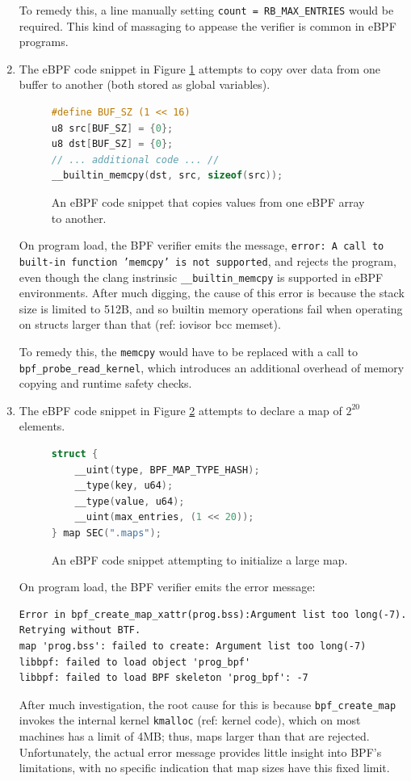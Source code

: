 \begin{enumerate}
    To remedy this, a line manually setting \texttt{count = RB\_MAX\_ENTRIES} would be required.
    This kind of massaging to appease the verifier is common in eBPF programs.

    \item The eBPF code snippet in Figure \ref{code:fail-2} attempts to copy over data from one
        buffer to another (both stored as global variables).
\begin{figure}[htpb]
\begin{lstlisting}[language=C]
#define BUF_SZ (1 << 16)
u8 src[BUF_SZ] = {0};
u8 dst[BUF_SZ] = {0};
// ... additional code ... //
__builtin_memcpy(dst, src, sizeof(src));
\end{lstlisting}
    \caption{An eBPF code snippet that copies values from one eBPF array to another.}
    \label{code:fail-2}
\end{figure}
    On program load, the BPF verifier emits the message, \texttt{error: A call to built-in
    function 'memcpy' is not supported}, and rejects the program, even though the clang instrinsic
    \texttt{\_\_builtin\_memcpy} is supported in eBPF environments. After much digging, the cause of
    this error is because the stack size is limited to 512B, and so builtin memory operations fail
    when operating on structs larger than that (ref: iovisor bcc memset).

    To remedy this, the \texttt{memcpy} would have to be replaced with a call to
    \texttt{bpf\_probe\_read\_kernel}, which introduces an additional overhead of memory copying and
    runtime safety checks.

    \item The eBPF code snippet in Figure \ref{code:fail-3} attempts to declare a map of $2^{20}$
        elements.
\begin{figure}[htpb]
    \centering
\begin{lstlisting}[language=C]
struct {
    __uint(type, BPF_MAP_TYPE_HASH);
    __type(key, u64);
    __type(value, u64);
    __uint(max_entries, (1 << 20));
} map SEC(".maps");
\end{lstlisting}
    \caption{An eBPF code snippet attempting to initialize a large map.}
    \label{code:fail-3}
\end{figure}

    On program load, the BPF verifier emits the error message:
\begin{lstlisting}
Error in bpf_create_map_xattr(prog.bss):Argument list too long(-7). Retrying without BTF.
map 'prog.bss': failed to create: Argument list too long(-7)
libbpf: failed to load object 'prog_bpf'
libbpf: failed to load BPF skeleton 'prog_bpf': -7
\end{lstlisting}

    After much investigation, the root cause for this is because \texttt{bpf\_create\_map} invokes
    the internal kernel \texttt{kmalloc} (ref: kernel code), which on most machines has a limit of
    4MB; thus, maps larger than that are rejected. Unfortunately, the actual error message provides
    little insight into BPF's limitations, with no specific indication that map sizes have this
    fixed limit.
\end{enumerate}


